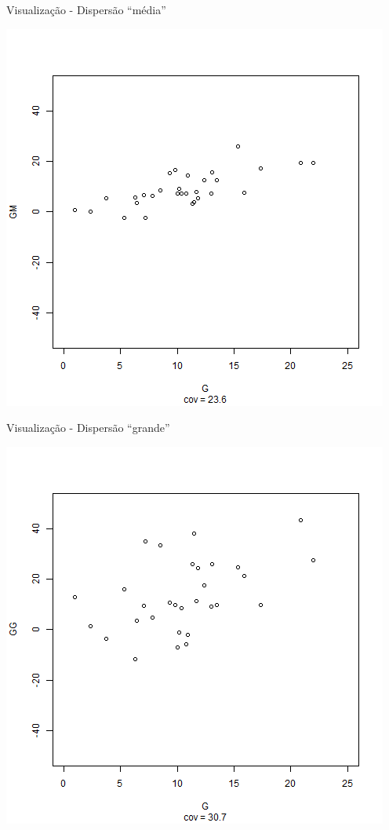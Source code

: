 \documentclass{beamer}
\begin{document}
\begin{frame}{\small Visualização - Dispersão ``média''}
  \begin{center}
    \includegraphics[height=.8\textheight]{Cap17/anim-2}
  \end{center}
\end{frame}

\begin{frame}{\small Visualização - Dispersão ``grande''}
  \begin{center}
    \includegraphics[height=.8\textheight]{Cap17/anim-3}
  \end{center}
\end{frame}
\end{document}
